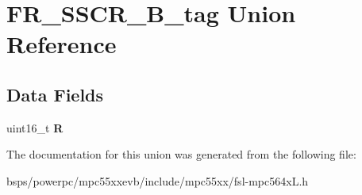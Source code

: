 \hypertarget{unionFR__SSCR__16B__tag}{}\section{F\+R\+\_\+\+S\+S\+C\+R\+\_\+B\+\_\+tag Union Reference}
\label{unionFR__SSCR__16B__tag}
\subsection*{Data Fields}
\begin{DoxyCompactItemize}
\item 
\mbox{\label{unionFR__SSCR__16B__tag_a3e3d86e772fa420e202056973fcb8423}} 
uint16\+\_\+t {\bfseries R}
\end{DoxyCompactItemize}


The documentation for this union was generated from the following file\+:\begin{DoxyCompactItemize}
\item 
bsps/powerpc/mpc55xxevb/include/mpc55xx/fsl-\/mpc564x\+L.\+h\end{DoxyCompactItemize}
